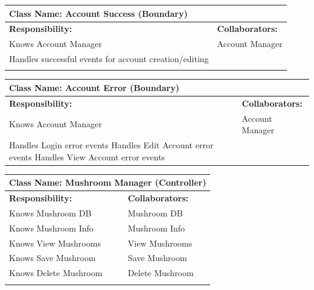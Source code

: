 \documentclass[]{article}
\begin{document}
\begin{itemize}
        \begin{table}[ht]
		\centering
		\begin{tabular}{|p{6cm}|p{6cm}|}
		\hline 
		\multicolumn{2}{|l|}{\textbf{Class Name: Account Success (Boundary)}} \\
		\hline
		\textbf{Responsibility:} & \textbf{Collaborators:} \\
		\hline
		Knows Account Manager & Account Manager\\
            Handles successful events for account creation/editing & \\
		\vspace{1in} & \\
		\hline
		\end{tabular}
	\end{table}

        \begin{table}[ht]
		\centering
		\begin{tabular}{|p{6cm}|p{6cm}|}
		\hline 
		\multicolumn{2}{|l|}{\textbf{Class Name: Account Error (Boundary)}} \\
		\hline
		\textbf{Responsibility:} & \textbf{Collaborators:} \\
		\hline
		Knows Account Manager & Account Manager\\
            Handles Login error events 
            Handles Edit Account error events
            Handles View Account error events
		\vspace{1in} & \\
		\hline
		\end{tabular}
	\end{table}

     \begin{table}[ht]
		\centering
		\begin{tabular}{|p{6cm}|p{6cm}|}
		\hline 
		\multicolumn{2}{|l|}{\textbf{Class Name: Mushroom Manager (Controller)}} \\
		\hline
		\textbf{Responsibility:} & \textbf{Collaborators:} \\
		\hline
            Knows Mushroom DB & Mushroom DB\\
		Knows Mushroom Info & Mushroom Info\\
		Knows View Mushrooms & View Mushrooms\\
            Knows Save Mushroom & Save Mushroom\\
		Knows Delete Mushroom & Delete Mushroom\\
		\vspace{1in} & \\
		\hline
		\end{tabular}
	\end{table}


\end{itemize}
\end{document}
